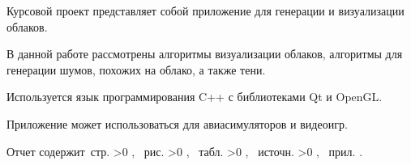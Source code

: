 \Referat

Курсовой проект представляет собой приложение для генерации и визуализации облаков.

В данной работе рассмотрены алгоритмы визуализации облаков, алгоритмы для генерации шумов,
похожих на облако, а также тени.

Используется язык программирования C++ с библиотеками Qt и OpenGL.

Приложение может использоваться для авиасимуляторов и видеоигр.

    Отчет содержит \pageref{LastPage}\,стр.%
    \ifnum \totfig >0
    , \totfig~рис.%
    \fi
    \ifnum \tottab >0
    , \tottab~табл.%
    \fi
    \ifnum \totbib >0
    , \totbib~источн.%
    \fi
    \ifnum \totapp >0
    , \totapp~прил.%
    \else
    .%
    \fi




